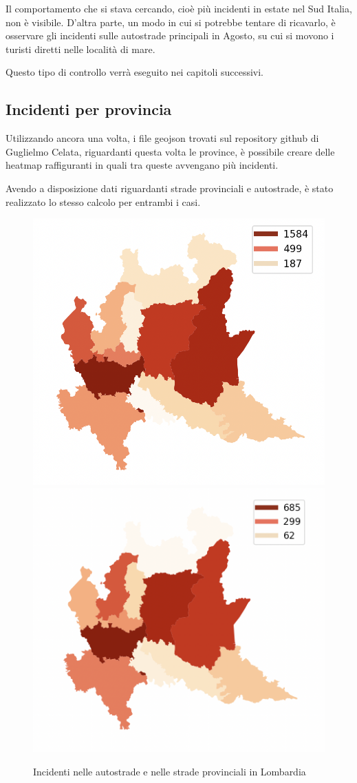 \documentclass[a4paper,12pt]{report}
\begin{document}
Il comportamento che si stava cercando, cioè più incidenti in estate nel 
Sud Italia, non è visibile. 
D'altra parte, un modo in cui si potrebbe tentare di ricavarlo, è osservare gli 
incidenti sulle autostrade principali in Agosto, su cui si movono i turisti diretti 
nelle località di mare.

Questo tipo di controllo verrà eseguito nei capitoli successivi.

\subsection{Incidenti per provincia}

Utilizzando ancora una volta, i file geojson trovati sul repository github di 
Guglielmo Celata, riguardanti questa volta le province, 
è possibile creare delle heatmap raffiguranti in quali tra queste avvengano più 
incidenti.

Avendo a disposizione dati riguardanti strade provinciali e autostrade, è stato realizzato 
lo stesso calcolo per entrambi i casi.

\begin{figure}
    \includegraphics[width=0.5\linewidth]{../src/provincia/lombardia_autostrade.png}
    \includegraphics[width=0.5\linewidth]{../src/provincia/lombardia_strade_prov.png}
    \caption{Incidenti nelle autostrade e nelle strade provinciali in Lombardia}
    \label{fig:lombardia-strade}
\end{figure}
\end{document}
